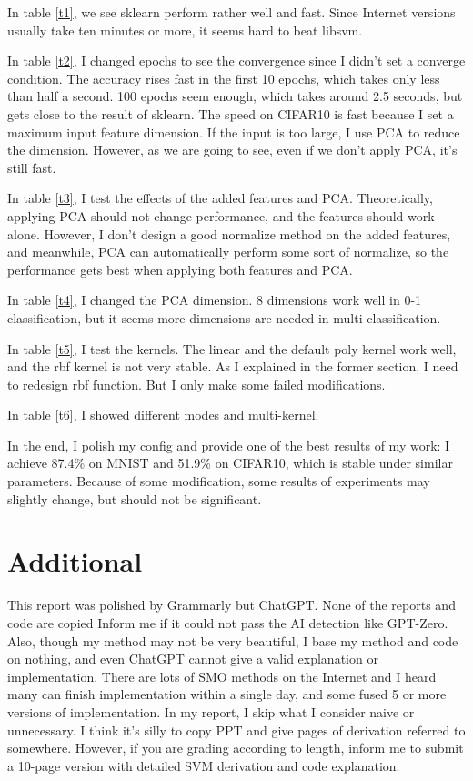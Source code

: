 \documentclass[conference]{IEEEtran}
\begin{document}
	In table \ref{t1}, we see sklearn perform rather well and fast. Since Internet versions usually take ten minutes or more, it seems hard to beat libsvm. 
	
	In table \ref{t2}, I changed epochs to see the convergence since I didn't set a converge condition. The accuracy rises fast in the first 10 epochs, which takes only less than half a second. 100 epochs seem enough, which takes around 2.5 seconds, but gets close to the result of sklearn. The speed on CIFAR10 is fast because I set a maximum input feature dimension. If the input is too large, I use PCA to reduce the dimension. However, as we are going to see, even if we don't apply PCA, it's still fast. 
	
	In table \ref{t3}, I test the effects of the added features and PCA. Theoretically, applying PCA should not change performance, and the features should work alone. However, I don't design a good normalize method on the added features, and meanwhile, PCA can automatically perform some sort of normalize, so the performance gets best when applying both features and PCA. 
	
	In table \ref{t4}, I changed the PCA dimension. 8 dimensions work well in 0-1 classification, but it seems more dimensions are needed in multi-classification. 
	
	In table \ref{t5}, I test the kernels. The linear and the default poly kernel work well, and the rbf kernel is not very stable. As I explained in the former section, I need to redesign rbf function. But I only make some failed modifications. 
	
	In table \ref{t6}, I showed different modes and multi-kernel. 
	
	In the end, I polish my config and provide one of the best results of my work: I achieve 87.4\% on MNIST and 51.9\% on CIFAR10, which is stable under similar parameters. Because of some modification, some results of experiments may slightly change, but should not be significant. 
	
	\section*{Additional}
	This report was polished by Grammarly but ChatGPT. None of the reports and code are copied Inform me if it could not pass the AI detection like GPT-Zero. Also, though my method may not be very beautiful, I base my method and code on nothing, and even ChatGPT cannot give a valid explanation or implementation. There are lots of SMO methods on the Internet and I heard many can finish implementation within a single day, and some fused 5 or more versions of implementation. In my report, I skip what I consider naive or unnecessary. I think it's silly to copy PPT and give pages of derivation referred to somewhere. However, if you are grading according to length, inform me to submit a 10-page version with detailed SVM derivation and code explanation. 
	
\end{document}
